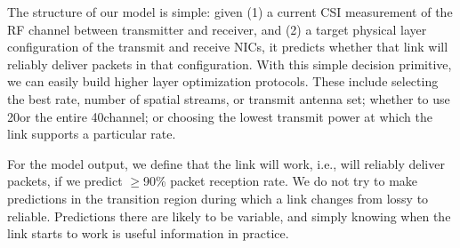 The structure of our model is simple: given (1) a current CSI measurement of the RF channel between transmitter and receiver, and (2) a target physical layer configuration of the transmit and receive NICs, it predicts whether that link will reliably deliver packets in that configuration.
With this simple decision primitive, we can easily build higher layer optimization protocols. These include selecting the best rate, number of spatial streams, or transmit antenna set; whether to use 20\MHz or the entire 40\MHz channel; or choosing the lowest transmit power at which the link supports a particular rate.

For the model output, we define that the link will work, i.e., will reliably deliver packets, if we predict $\geq$90\% packet reception rate. We do not try to make predictions in the transition region during which a link changes from lossy to reliable. Predictions there are likely to be variable, and simply knowing when the link starts to work is useful information in practice.

\ifx\mainfile\undefined

\fi
